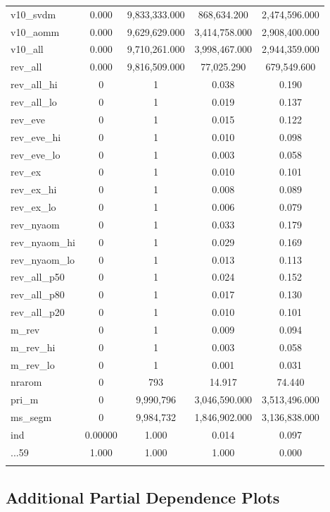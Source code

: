 \documentclass[11pt,]{article}
\begin{document}
\begin{table}[!htbp]
\begin{tabular}{@{\extracolsep{5pt}}lcccc}
v10\_svdm & 0.000 & 9,833,333.000 & 868,634.200 & 2,474,596.000 \\ 
v10\_aomm & 0.000 & 9,629,629.000 & 3,414,758.000 & 2,908,400.000 \\ 
v10\_all & 0.000 & 9,710,261.000 & 3,998,467.000 & 2,944,359.000 \\ 
rev\_all & 0.000 & 9,816,509.000 & 77,025.290 & 679,549.600 \\ 
rev\_all\_hi & 0 & 1 & 0.038 & 0.190 \\ 
rev\_all\_lo & 0 & 1 & 0.019 & 0.137 \\ 
rev\_eve & 0 & 1 & 0.015 & 0.122 \\ 
rev\_eve\_hi & 0 & 1 & 0.010 & 0.098 \\ 
rev\_eve\_lo & 0 & 1 & 0.003 & 0.058 \\ 
rev\_ex & 0 & 1 & 0.010 & 0.101 \\ 
rev\_ex\_hi & 0 & 1 & 0.008 & 0.089 \\ 
rev\_ex\_lo & 0 & 1 & 0.006 & 0.079 \\ 
rev\_nyaom & 0 & 1 & 0.033 & 0.179 \\ 
rev\_nyaom\_hi & 0 & 1 & 0.029 & 0.169 \\ 
rev\_nyaom\_lo & 0 & 1 & 0.013 & 0.113 \\ 
rev\_all\_p50 & 0 & 1 & 0.024 & 0.152 \\ 
rev\_all\_p80 & 0 & 1 & 0.017 & 0.130 \\ 
rev\_all\_p20 & 0 & 1 & 0.010 & 0.101 \\ 
m\_rev & 0 & 1 & 0.009 & 0.094 \\ 
m\_rev\_hi & 0 & 1 & 0.003 & 0.058 \\ 
m\_rev\_lo & 0 & 1 & 0.001 & 0.031 \\ 
nrarom & 0 & 793 & 14.917 & 74.440 \\ 
pri\_m & 0 & 9,990,796 & 3,046,590.000 & 3,513,496.000 \\ 
ms\_segm & 0 & 9,984,732 & 1,846,902.000 & 3,136,838.000 \\ 
ind & 0.00000 & 1.000 & 0.014 & 0.097 \\ 
...59 & 1.000 & 1.000 & 1.000 & 0.000 \\ 
\hline \\[-1.8ex] 
\end{tabular} 
\end{table}

\hypertarget{additional-partial-dependence-plots}{%
\subsection{\texorpdfstring{Additional Partial Dependence Plots
\label{chap:ap2}}{Additional Partial Dependence Plots }}\label{additional-partial-dependence-plots}}
\end{document}
